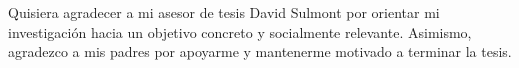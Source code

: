 Quisiera agradecer a mi asesor de tesis David Sulmont por orientar mi investigación hacia un objetivo concreto y socialmente relevante. Asimismo, agradezco a mis padres por apoyarme y mantenerme motivado a terminar la tesis.